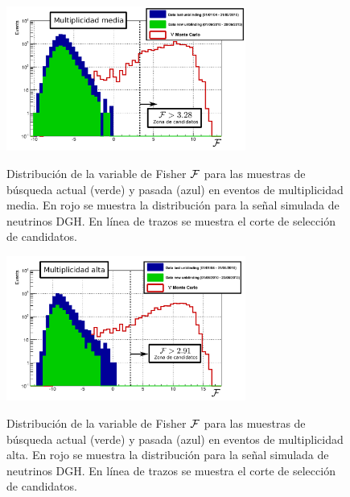 	\begin{figure}[ht!]
		\begin{center}
			\includegraphics[width=0.7\textwidth]{fig/resultadosAuger/DGH_Retrining_May2012_2_med_Nor_mod}\\
			\caption{\label{fig:unblindingDGHM}
			Distribuci\'on de la variable de Fisher $\cal F$ para las muestras de b\'usqueda actual (verde) y pasada (azul) en eventos de multiplicidad media. En rojo se muestra la distribuci\'on para la se\~nal simulada de neutrinos DGH.
			En l\'inea de trazos se muestra el corte de selecci\'on de candidatos.
			}
		\end{center}
	\end{figure}
	
	\begin{figure}[ht!]
		\begin{center}
			\includegraphics[width=0.7\textwidth]{fig/resultadosAuger/DGH_Retrining_May2012_2_high_Nor_mod}\\
			\caption{\label{fig:unblindingDGHH}
			Distribuci\'on de la variable de Fisher $\cal F$ para las muestras de b\'usqueda actual (verde) y pasada (azul) en eventos de multiplicidad alta. En rojo se muestra la distribuci\'on para la se\~nal simulada de neutrinos DGH.
			En l\'inea de trazos se muestra el corte de selecci\'on de candidatos.
			}
		\end{center}
	\end{figure}
	
